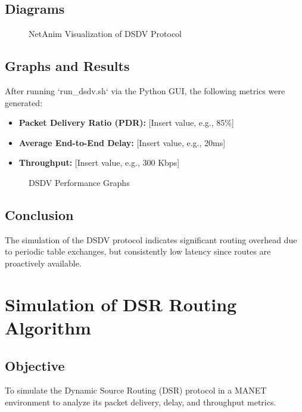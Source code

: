\documentclass[12pt,a4paper]{report}
\begin{document}
\section{Diagrams}
\begin{figure}[H]
    \centering
    \caption{NetAnim Visualization of DSDV Protocol}
\end{figure}

\section{Graphs and Results}
After running `run\_dsdv.sh` via the Python GUI, the following metrics were generated:
\begin{itemize}
    \item \textbf{Packet Delivery Ratio (PDR):} [Insert value, e.g., 85\%]
    \item \textbf{Average End-to-End Delay:} [Insert value, e.g., 20ms]
    \item \textbf{Throughput:} [Insert value, e.g., 300 Kbps]
\end{itemize}

\begin{figure}[H]
    \centering
    \caption{DSDV Performance Graphs}
\end{figure}

\section{Conclusion}
The simulation of the DSDV protocol indicates significant routing overhead due to periodic table exchanges, but consistently low latency since routes are proactively available.

\chapter{Simulation of DSR Routing Algorithm}

\section{Objective}
To simulate the Dynamic Source Routing (DSR) protocol in a MANET environment to analyze its packet delivery, delay, and throughput metrics.
\end{document}
